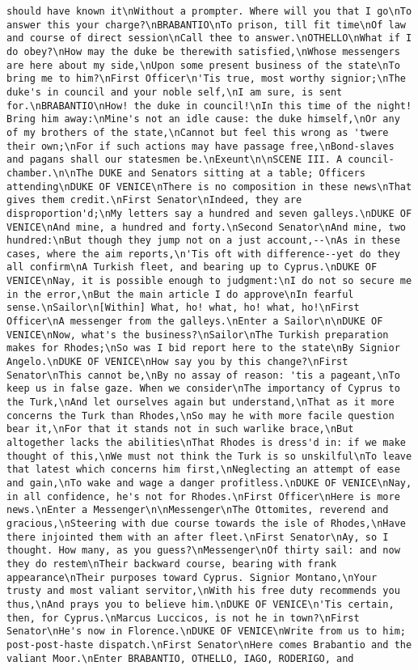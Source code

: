 \begin{verbatim}
should have known it\nWithout a prompter. Where will you that I go\nTo answer this your charge?\nBRABANTIO\nTo prison, till fit time\nOf law and course of direct session\nCall thee to answer.\nOTHELLO\nWhat if I do obey?\nHow may the duke be therewith satisfied,\nWhose messengers are here about my side,\nUpon some present business of the state\nTo bring me to him?\nFirst Officer\n'Tis true, most worthy signior;\nThe duke's in council and your noble self,\nI am sure, is sent for.\nBRABANTIO\nHow! the duke in council!\nIn this time of the night! Bring him away:\nMine's not an idle cause: the duke himself,\nOr any of my brothers of the state,\nCannot but feel this wrong as 'twere their own;\nFor if such actions may have passage free,\nBond-slaves and pagans shall our statesmen be.\nExeunt\n\nSCENE III. A council-chamber.\n\nThe DUKE and Senators sitting at a table; Officers attending\nDUKE OF VENICE\nThere is no composition in these news\nThat gives them credit.\nFirst Senator\nIndeed, they are disproportion'd;\nMy letters say a hundred and seven galleys.\nDUKE OF VENICE\nAnd mine, a hundred and forty.\nSecond Senator\nAnd mine, two hundred:\nBut though they jump not on a just account,--\nAs in these cases, where the aim reports,\n'Tis oft with difference--yet do they all confirm\nA Turkish fleet, and bearing up to Cyprus.\nDUKE OF VENICE\nNay, it is possible enough to judgment:\nI do not so secure me in the error,\nBut the main article I do approve\nIn fearful sense.\nSailor\n[Within] What, ho! what, ho! what, ho!\nFirst Officer\nA messenger from the galleys.\nEnter a Sailor\n\nDUKE OF VENICE\nNow, what's the business?\nSailor\nThe Turkish preparation makes for Rhodes;\nSo was I bid report here to the state\nBy Signior Angelo.\nDUKE OF VENICE\nHow say you by this change?\nFirst Senator\nThis cannot be,\nBy no assay of reason: 'tis a pageant,\nTo keep us in false gaze. When we consider\nThe importancy of Cyprus to the Turk,\nAnd let ourselves again but understand,\nThat as it more concerns the Turk than Rhodes,\nSo may he with more facile question bear it,\nFor that it stands not in such warlike brace,\nBut altogether lacks the abilities\nThat Rhodes is dress'd in: if we make thought of this,\nWe must not think the Turk is so unskilful\nTo leave that latest which concerns him first,\nNeglecting an attempt of ease and gain,\nTo wake and wage a danger profitless.\nDUKE OF VENICE\nNay, in all confidence, he's not for Rhodes.\nFirst Officer\nHere is more news.\nEnter a Messenger\n\nMessenger\nThe Ottomites, reverend and gracious,\nSteering with due course towards the isle of Rhodes,\nHave there injointed them with an after fleet.\nFirst Senator\nAy, so I thought. How many, as you guess?\nMessenger\nOf thirty sail: and now they do restem\nTheir backward course, bearing with frank appearance\nTheir purposes toward Cyprus. Signior Montano,\nYour trusty and most valiant servitor,\nWith his free duty recommends you thus,\nAnd prays you to believe him.\nDUKE OF VENICE\n'Tis certain, then, for Cyprus.\nMarcus Luccicos, is not he in town?\nFirst Senator\nHe's now in Florence.\nDUKE OF VENICE\nWrite from us to him; post-post-haste dispatch.\nFirst Senator\nHere comes Brabantio and the valiant Moor.\nEnter BRABANTIO, OTHELLO, IAGO, RODERIGO, and 
\end{verbatim}
